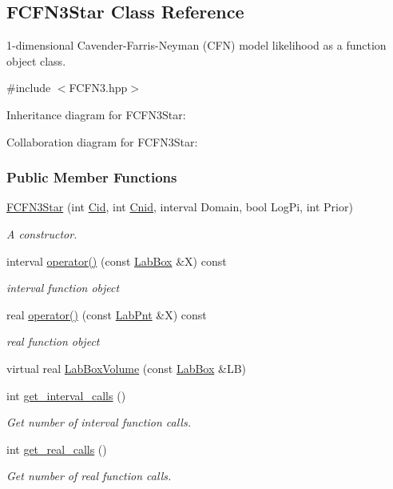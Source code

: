 \hypertarget{classFCFN3Star}{\subsection{\-F\-C\-F\-N3\-Star \-Class \-Reference}
\label{classFCFN3Star}
}


1-\/dimensional \-Cavender-\/\-Farris-\/\-Neyman (\-C\-F\-N) model likelihood as a function object class.  




{\ttfamily \#include $<$\-F\-C\-F\-N3.\-hpp$>$}



\-Inheritance diagram for \-F\-C\-F\-N3\-Star\-:


\-Collaboration diagram for \-F\-C\-F\-N3\-Star\-:
\subsubsection*{\-Public \-Member \-Functions}
\begin{DoxyCompactItemize}
\item 
\hyperlink{classFCFN3Star_a762c21a9ed9cba72242f87d27fc722fb}{\-F\-C\-F\-N3\-Star} (int \hyperlink{classFCFN3Star_a75abf79fc92c2683219829ce86a43a77}{\-Cid}, int \hyperlink{classFCFN3Star_ace3c43e5c025a8cd9976ce78202fa542}{\-Cnid}, interval \-Domain, bool \-Log\-Pi, int \-Prior)
\begin{DoxyCompactList}\small\item\em \-A constructor. \end{DoxyCompactList}\item 
interval \hyperlink{classFCFN3Star_af2b3d4543f1ba7f9040e24433ac7436e}{operator()} (const \hyperlink{classLabBox}{\-Lab\-Box} \&\-X) const 
\begin{DoxyCompactList}\small\item\em interval function object \end{DoxyCompactList}\item 
real \hyperlink{classFCFN3Star_a3ea99664a49607ab495aad38b6a4a31d}{operator()} (const \hyperlink{classLabPnt}{\-Lab\-Pnt} \&\-X) const 
\begin{DoxyCompactList}\small\item\em real function object \end{DoxyCompactList}\item 
virtual real \hyperlink{classFCFN3Star_ad9fea247c542560b3c13dd0ad340d25f}{\-Lab\-Box\-Volume} (const \hyperlink{classLabBox}{\-Lab\-Box} \&\-L\-B)
\item 
int \hyperlink{classFCFN3Star_aaa71b2dc822592e81afb4b12fdd8463c}{get\-\_\-interval\-\_\-calls} ()
\begin{DoxyCompactList}\small\item\em \-Get number of interval function calls. \end{DoxyCompactList}\item 
int \hyperlink{classFCFN3Star_a1a5955ccbbecdce0f6cab399ef93f53c}{get\-\_\-real\-\_\-calls} ()
\begin{DoxyCompactList}\small\item\em \-Get number of real function calls. \end{DoxyCompactList}\end{DoxyCompactItemize}
